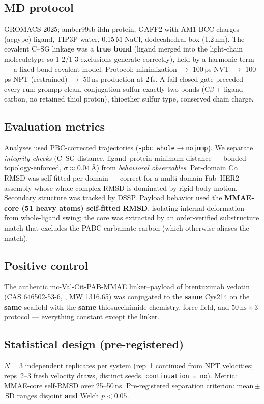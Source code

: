 \documentclass[10pt,twocolumn]{article}
\begin{document}
\subsection{MD protocol}
GROMACS 2025\cite{abraham2015}; amber99sb-ildn\cite{lindorfflarsen2010} protein, GAFF2\cite{wang2004}
with AM1-BCC charges\cite{jakalian2002} (acpype\cite{sousadasilva2012}) ligand, TIP3P
water\cite{jorgensen1983}, 0.15\,M NaCl, dodecahedral box (1.2\,nm). The covalent C--SG linkage was a
\textbf{true bond} (ligand merged into the light-chain moleculetype so 1-2/1-3 exclusions generate
correctly), held by a harmonic term --- a fixed-bond covalent model. Protocol: minimization
$\rightarrow$ 100\,ps NVT $\rightarrow$ 100\,ps NPT (restrained) $\rightarrow$ 50\,ns production at 2\,fs.
A fail-closed gate preceded every run: grompp clean, conjugation sulfur exactly two bonds (C$\beta$ +
ligand carbon, no retained thiol proton), thioether sulfur type, conserved chain charge.

\subsection{Evaluation metrics}
Analyses used PBC-corrected trajectories (\texttt{-pbc whole}$\rightarrow$\texttt{nojump}). We separate
\emph{integrity checks} (C--SG distance, ligand--protein minimum distance --- bonded-topology-enforced,
$\sigma{\approx}0.04$\,\AA) from \emph{behavioral observables}. Per-domain C$\alpha$ RMSD was
self-fitted per domain --- correct for a multi-domain Fab--HER2 assembly whose whole-complex RMSD is
dominated by rigid-body motion. Secondary structure was tracked by DSSP.\cite{kabsch1983} Payload
behavior used the \textbf{MMAE-core (51 heavy atoms) self-fitted RMSD}, isolating internal deformation
from whole-ligand swing; the core was extracted by an order-verified substructure match that excludes the
PABC carbamate carbon (which otherwise aliases the match).

\subsection{Positive control}
The authentic mc-Val-Cit-PAB-MMAE linker--payload of brentuximab vedotin (CAS 646502-53-6,
, MW 1316.65) was conjugated to the \textbf{same} Cys214 on the \textbf{same} scaffold
with the \textbf{same} thiosuccinimide chemistry, force field, and $50\,\text{ns}\times3$ protocol ---
everything constant except the linker.

\subsection{Statistical design (pre-registered)}
$N{=}3$ independent replicates per system (rep~1 continued from NPT velocities; reps~2--3 fresh velocity
draws, distinct seeds, \texttt{continuation\,=\,no}). Metric: MMAE-core self-RMSD over 25--50\,ns.
Pre-registered separation criterion: mean\,$\pm$\,SD ranges disjoint \textbf{and} Welch $p<0.05$.
\end{document}
